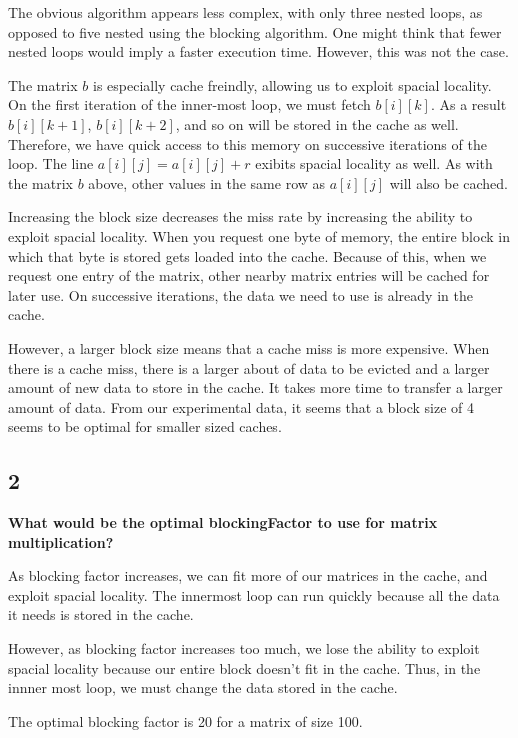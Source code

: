 \documentclass[letterpaper, 12pt, oneside]{memoir}
\begin{document}
The obvious algorithm appears less complex, with only three nested loops, as
opposed to five nested using the blocking algorithm. One might think that
fewer nested loops would imply a faster execution time. However, this was
not the case.

The matrix $b$ is especially cache freindly, allowing us to exploit spacial
locality. On the first iteration of the inner-most loop, we must fetch
$b[i][k]$. As a result $b[i][k+1]$, $b[i][k+2]$, and so on will be stored in 
the cache as well. Therefore, we have quick access to this memory on successive
iterations of the loop. The line $ a[i][j] = a[i][j] + r$  exibits spacial
locality as well. As with the matrix $b$ above, other values in the same row 
as $a[i][j]$ will also be cached. 

Increasing the block size decreases the miss rate by increasing the ability to
exploit spacial locality. When you request one byte of memory, the
entire block in which that byte is stored gets loaded into the cache. Because 
of this, when we request one entry of the matrix, other nearby matrix entries
will be cached for later use. On successive iterations, the data we need to use
is already in the cache.

However, a larger block size means that a cache miss is more expensive. When
there is a cache miss, there is a larger about of data to be evicted and a
larger amount of new data to store in the cache. It takes more time to transfer
a larger amount of data. From our experimental data, it seems that a block size
of 4 seems to be optimal for smaller sized caches.




\subsection{2}
\textbf{What would be the optimal blockingFactor to use for matrix
multiplication?}

As blocking factor increases, we can fit more of our matrices in the cache, 
and exploit spacial locality. The innermost loop can run quickly because
all the data it needs is stored in the cache. 

However, as blocking factor increases too much, we lose the ability to exploit
spacial locality because our entire block doesn't fit in the cache. Thus, 
in the innner most loop, we must change the data stored in the cache.

The optimal blocking factor is 20 for a matrix of size 100.
\end{document}
